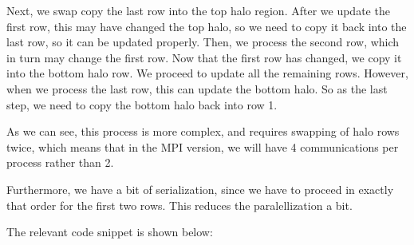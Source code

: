 \documentclass{report}
\begin{document}
Next, we swap copy the last row into the top halo region. After we update the first 
row, this may have changed the top halo, so we need to copy it back into the last row, 
so it can be updated properly. Then, we process the second row, which in turn may 
change the first row. Now that the first row has changed, we copy it into the bottom 
halo row. 
We proceed to update all the remaining rows. However, when we process the last row, 
this can update the bottom halo. So as the last step, we need to copy the bottom 
halo back into row 1. 

As we can see, this process is more complex, and requires swapping of halo rows 
twice, which means that in the MPI version, we will have 4 communications per process 
rather than 2. 

Furthermore, we have a bit of serialization, since we have to proceed in exactly 
that order for the first two rows. This reduces the paralellization a bit. 

The relevant code snippet is shown below:
\end{document}
